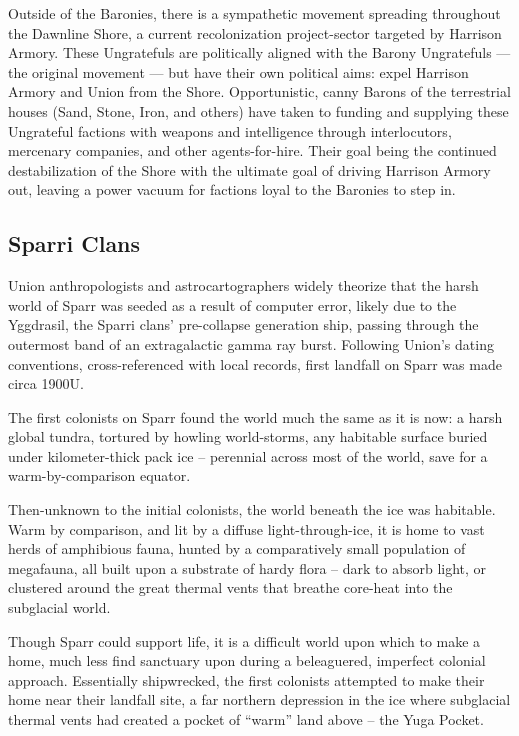 Outside of the Baronies, there is a sympathetic movement spreading throughout the Dawnline
Shore, a current recolonization project-sector targeted by Harrison Armory. These Ungratefuls
are politically aligned with the Barony Ungratefuls — the original movement — but have their own
political aims: expel Harrison Armory and Union from the Shore. Opportunistic, canny Barons of
the terrestrial houses (Sand, Stone, Iron, and others) have taken to funding and supplying these
Ungrateful factions with weapons and intelligence through interlocutors, mercenary companies,
and other agents-for-hire. Their goal being the continued destabilization of the Shore with the
ultimate goal of driving Harrison Armory out, leaving a power vacuum for factions loyal to the
Baronies to step in.

\subsection{Sparri Clans}

Union anthropologists and astrocartographers widely theorize that the harsh world of Sparr was
seeded as a result of computer error, likely due to the Yggdrasil, the Sparri clans' pre-collapse
generation ship, passing through the outermost band of an extragalactic gamma ray burst.
Following Union's dating conventions, cross-referenced with local records, first landfall on Sparr
was made circa 1900U.

The first colonists on Sparr found the world much the same as it is now: a harsh global tundra,
tortured by howling world-storms, any habitable surface buried under kilometer-thick pack ice --
perennial across most of the world, save for a warm-by-comparison equator.

Then-unknown to the initial colonists, the world beneath the ice was habitable. Warm by
comparison, and lit by a diffuse light-through-ice, it is home to vast herds of amphibious fauna,
hunted by a comparatively small population of megafauna, all built upon a substrate of hardy flora
-- dark to absorb light, or clustered around the great thermal vents that breathe core-heat into the
subglacial world.

Though Sparr could support life, it is a difficult world upon which to make a home, much less find
sanctuary upon during a beleaguered, imperfect colonial approach. Essentially shipwrecked, the
first colonists attempted to make their home near their landfall site, a far northern depression in
the ice where subglacial thermal vents had created a pocket of ``warm'' land above -- the Yuga
Pocket.

